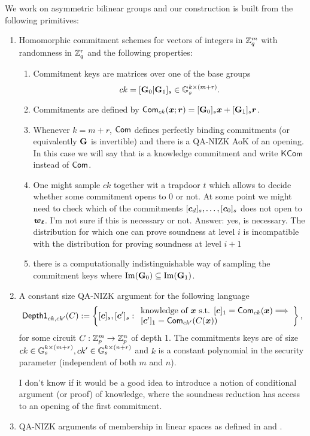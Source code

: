 We work on asymmetric bilinear groups and our construction is built from the following primitives:
\begin{enumerate}
\item Homomorphic commitment schemes for vectors of integers in $\mathbb{Z}_q^m$ with randomness in $\mathbb{Z}_q^r$ and the following properties:
\begin{enumerate}
	\item Commitment keys are matrices over one of the base groups $$ck=[\mathbf{{G}}_0|\mathbf{{G}}_1]_s\in\mathbb{G}_s^{k\times(m+r)}.$$
	\item Commitments are defined by $\mathsf{Com}_{ck}({\boldsymbol{x}};{\boldsymbol{r}})=[\mathbf{{G}}_0]_s{\boldsymbol{x}}+[\mathbf{{G}}_1]_s{\boldsymbol{r}}$.		\item Whenever $k=m+r$, $\mathsf{Com}$ defines perfectly binding commitments (or equivalently $\mathbf{{G}}$ is invertible) and 	                   there is a QA-NIZK AoK of an opening. In this case we will say that is a knowledge commitment and write $\mathsf{KCom}$ instead of $\mathsf{Com}$.
\item One might sample $ck$ together wit a trapdoor $t$ which allows to decide whether some commitment opens to $0$ or not. {\color{red} At some point we might need to check which of the commitments $[{\boldsymbol{c}}_d]_s,\ldots,[{\boldsymbol{c}}_0]_s$ does not open to ${\boldsymbol{{\boldsymbol{w}}_\ell}}$.  I'm not sure if this is necessary or not. Answer: yes, is necessary. The distribution for which one can prove soundness at level $i$ is incompatible with the distribution for proving soundness at level $i+1$}
	\item there is a computationally indistinguishable way of sampling the commitment keys where $\mathrm{Im}(\mathbf{{G}}_0)\subseteq\mathrm{Im}\mathrm(\mathbf{{G}}_1)$. 
\end{enumerate}
\item A constant size QA-NIZK argument for the following language
$$
\mathsf{Depth1}_{ck,ck'}(C):=\left\{[{\boldsymbol{c}}]_s,[{\boldsymbol{c}}']_s:
\begin{array}{l}
		\text{knowledge of } {\boldsymbol{x}} \text{ s.t. }
		{[{\boldsymbol{c}}]_1=\mathsf{Com}_{ck}({\boldsymbol{x}})}
		\Longrightarrow\\
		{[{\boldsymbol{c}}']_1=\mathsf{Com}_{ck'}(C({\boldsymbol{x}}))}
	\end{array}\right\},
$$
for some circuit $C:\mathbb{Z}_p^m\to \mathbb{Z}_p^n$ of depth 1. The commitments keys are of size $ck\in\mathbb{G}_s^{k\times(m+r)},ck'\in\mathbb{G}_s^{k\times(n+r)}$ and $k$ is a constant polynomial in the security parameter (independent of both $m$ and $n$).


{\color{red} I don't know if it would be a good idea to introduce a notion of conditional argument (or proof) of knowledge, where the soundness reduction has access to an opening of the first commitment.}
\item QA-NIZK arguments of membership in linear spaces as defined in \cite{EC:KilWee15} and \cite{AC:GonHevRaf15}.
\end{enumerate}

